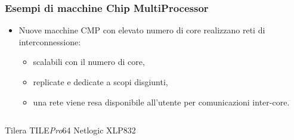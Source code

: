 \documentclass{beamer}
\newcommand{\tile}{TILE\textit{Pro}64}
\begin{document}
\begin{frame}
  \frametitle{Esempi di macchine Chip MultiProcessor}
  \begin{itemize}
  \item Nuove macchine CMP con elevato numero di core realizzano reti di interconnessione:
    \begin{itemize}
    \item scalabili con il numero di core,
    \item replicate e dedicate a scopi disgiunti,
    \item una rete viene resa disponibile all'utente per comunicazioni inter-core.
    \end{itemize}
  \end{itemize}
  \vspace{5mm}
  \begin{columns}[c]
    {\small Tilera \tile}
    {\small Netlogic XLP832}
  \end{columns}
  \begin{columns}[c]

\end{columns}
\end{frame}
\end{document}
